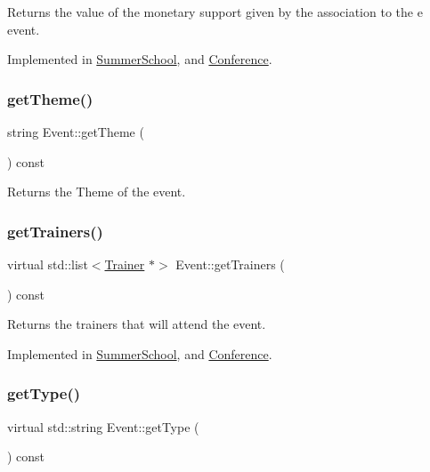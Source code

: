 Returns the value of the monetary support given by the association to the e event. 



Implemented in \hyperlink{classSummerSchool_a86f34a2f39dcd33171e77c386165219c}{Summer\+School}, and \hyperlink{classConference_a6ca3f0f7b2714881dbc108ea7f08646f}{Conference}.

\mbox{\label{classEvent_ad83e88dd2fe78a6840dd2c71d217b490}} 
\subsubsection{\texorpdfstring{get\+Theme()}{getTheme()}}
{\footnotesize\ttfamily string Event\+::get\+Theme (\begin{DoxyParamCaption}{ }\end{DoxyParamCaption}) const}



Returns the Theme of the event. 

\mbox{\label{classEvent_a11aad3e5a7ee85bc61b6811d050c5d70}} 
\subsubsection{\texorpdfstring{get\+Trainers()}{getTrainers()}}
{\footnotesize\ttfamily virtual std\+::list$<$\hyperlink{classTrainer}{Trainer} $\ast$$>$ Event\+::get\+Trainers (\begin{DoxyParamCaption}{ }\end{DoxyParamCaption}) const\hspace{0.3cm}{\ttfamily [pure virtual]}}



Returns the trainers that will attend the event. 



Implemented in \hyperlink{classSummerSchool_aba18410ee9fbafd26858232104b5b39f}{Summer\+School}, and \hyperlink{classConference_aae9e92d48205a80fa42e94564e3568c5}{Conference}.

\mbox{\label{classEvent_a224dbd9a9aee5937ba0c8ea1a056af1f}} 
\subsubsection{\texorpdfstring{get\+Type()}{getType()}}
{\footnotesize\ttfamily virtual std\+::string Event\+::get\+Type (\begin{DoxyParamCaption}{ }\end{DoxyParamCaption}) const\hspace{0.3cm}{\ttfamily [pure virtual]}}



